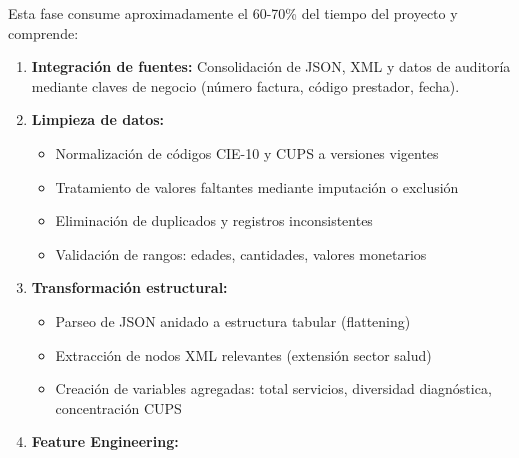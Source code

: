 \documentclass[12pt,letterpaper]{report}
\begin{document}
Esta fase consume aproximadamente el 60-70\% del tiempo del proyecto y comprende:

\begin{enumerate}
    \item \textbf{Integración de fuentes:} Consolidación de JSON, XML y datos de auditoría mediante claves de negocio (número factura, código prestador, fecha).
    
    \item \textbf{Limpieza de datos:}
    \begin{itemize}
        \item Normalización de códigos CIE-10 y CUPS a versiones vigentes
        \item Tratamiento de valores faltantes mediante imputación o exclusión
        \item Eliminación de duplicados y registros inconsistentes
        \item Validación de rangos: edades, cantidades, valores monetarios
    \end{itemize}
    
    \item \textbf{Transformación estructural:}
    \begin{itemize}
        \item Parseo de JSON anidado a estructura tabular (flattening)
        \item Extracción de nodos XML relevantes (extensión sector salud)
        \item Creación de variables agregadas: total servicios, diversidad diagnóstica, concentración CUPS
    \end{itemize}
    
    \item \textbf{Feature Engineering:}
\end{enumerate}
\end{document}
